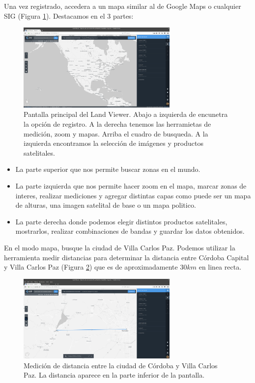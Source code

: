 \documentclass[a4paper,10pt]{article}
\begin{document}
Una vez registrado, accedera a un mapa  similar al de Google Maps o cualquier SIG (Figura \ref{fig:main}). Destacamos en el 3 partes:

\begin{figure}[h!]
    \centering
    \includegraphics[width=0.7\textwidth]{fig:main.png}
    \caption{Pantalla principal del Land Viewer. Abajo a izquierda de encunetra la opción de registro. A la derecha tenemos las herramietas de medición, zoom y mapas. Arriba el cuadro de busqueda. A la izquierda encontramos la selección de imágenes y productos satelitales.}
    \label{fig:main}
\end{figure}

\begin{itemize}
    \item La parte superior que nos permite buscar zonas en el mundo.
    \item La parte izquierda que nos permite hacer zoom en el mapa, marcar zonas de interes, realizar mediciones y agregar distintas capas como puede ser un mapa de alturas, una imagen satelital de base o un mapa politico.
    \item La parte derecha donde podemos elegir distintos productos satelitales, mostrarlos, realizar combinaciones de bandas y guardar los datos obtenidos.
\end{itemize}

En el modo mapa, busque la ciudad de Villa Carlos Paz. Podemos utilizar la herramienta medir distancias para determinar la distancia entre Córdoba Capital y Villa Carlos Paz (Figura \ref{fig:distancia}) que es de aproximadamente $30km$ en linea recta.

\begin{figure}[h!]
    \centering
    \includegraphics[width=0.7\textwidth]{fig:distancia.png}
    \caption{Medición de distancia entre la ciudad de Córdoba y Villa Carlos Paz. La distancia aparece en la parte inferior de la pantalla.}
    \label{fig:distancia}
\end{figure}
\end{document}
